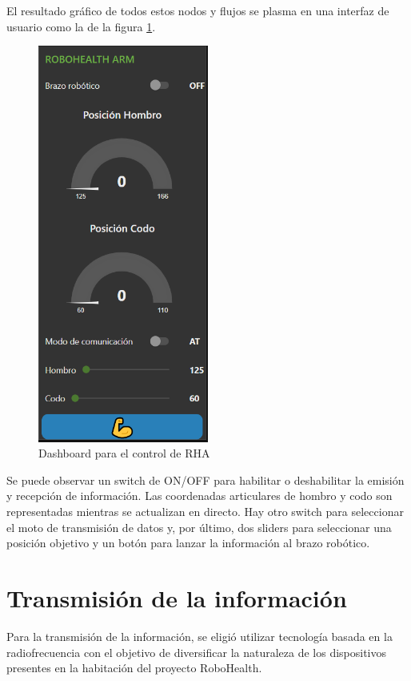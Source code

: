 El resultado gráfico de todos estos nodos y flujos se plasma en una interfaz de usuario como la de la figura \ref{fig:DashRHA}.

\begin{figure}[H]
\centering
\includegraphics[width=0.5\textwidth]{figuras/DashRHA.png}
\caption{Dashboard para el control de RHA}
\label{fig:DashRHA}
\end{figure}

Se puede observar un switch de ON/OFF para habilitar o deshabilitar la emisión y recepción de información. Las coordenadas articulares de hombro y codo son representadas mientras se actualizan en directo. Hay otro switch para seleccionar el moto de transmisión de datos y, por último, dos sliders para seleccionar una posición objetivo y un botón para lanzar la información al brazo robótico.


\section{Transmisión de la información}

Para la transmisión de la información, se eligió utilizar tecnología basada en la radiofrecuencia con el objetivo de diversificar la naturaleza de los dispositivos presentes en la habitación del proyecto RoboHealth.

